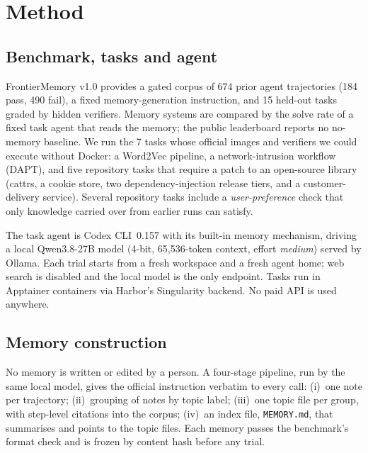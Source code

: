\section{Method}
\label{sec:method}

\subsection{Benchmark, tasks and agent}
FrontierMemory v1.0 provides a gated corpus of 674 prior agent trajectories (184 pass, 490 fail), a fixed memory-generation instruction, and 15 held-out tasks graded by hidden verifiers.
Memory systems are compared by the solve rate of a fixed task agent that reads the memory; the public leaderboard reports no no-memory baseline.
We run the 7 tasks whose official images and verifiers we could execute without Docker: a Word2Vec pipeline, a network-intrusion workflow (DAPT), and five repository tasks that require a patch to an open-source library (cattrs, a cookie store, two dependency-injection release tiers, and a customer-delivery service).
Several repository tasks include a \emph{user-preference} check that only knowledge carried over from earlier runs can satisfy.

The task agent is Codex CLI~0.157 with its built-in memory mechanism, driving a local Qwen3.8-27B model (4-bit, 65{,}536-token context, effort \emph{medium}) served by Ollama.
Each trial starts from a fresh workspace and a fresh agent home; web search is disabled and the local model is the only endpoint.
Tasks run in Apptainer containers via Harbor's Singularity backend.
No paid API is used anywhere.

\subsection{Memory construction}
No memory is written or edited by a person.
A four-stage pipeline, run by the same local model, gives the official instruction verbatim to every call:
(i)~one note per trajectory;
(ii)~grouping of notes by topic label;
(iii)~one topic file per group, with step-level citations into the corpus;
(iv)~an index file, \texttt{MEMORY.md}, that summarises and points to the topic files.
Each memory passes the benchmark's format check and is frozen by content hash before any trial.

